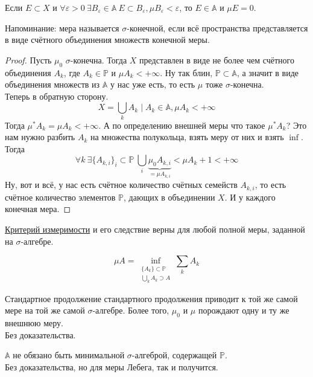 \documentclass{article}
\let\eps\varepsilon
\begin{document}
    \begin{corollary}
        Если $E\subset X$ и $\forall\eps>0~\exists B_\eps\in\mathbb A~E\subset B_\eps,\mu B_\eps<\eps$, то $E\in\mathbb A$ и $\mu E=0$.
    \end{corollary}
    \begin{property}
        Напоминание: мера называется $\sigma$-конечной, если всё пространства представляется в виде счётного объединения множеств конечной меры.
    \end{property}
    \begin{proof}
        Пусть $\mu_0$ $\sigma$-конечна. Тогда $X$ представлен в виде не более чем счётного объединения $A_k$, где $A_k\in\mathbb P$ и $\mu A_k<+\infty$. Ну так блин, $\mathbb P\subset\mathbb A$, а значит в виде объединения множеств из $\mathbb A$ у нас уже есть, то есть $\mu$ тоже $\sigma$-конечна.\\
        Теперь в обратную сторону. 
        $$
        X=\bigcup\limits_kA_k\mid A_k\in\mathbb A,\mu A_k<+\infty
        $$
        Тогда $\mu^*A_k=\mu A_k<+\infty$. А по определению внешней меры что такое $\mu^*A_k$? Это нам нужно разбить $A_k$ на множества полукольца, взять меру от них и взять $\inf$.  Тогда
        $$
        \forall k~\exists\{A_{k,i}\}_i\subset\mathbb P~\bigcup\limits_i\underbrace{\mu_0 A_{k,i}}_{=\mu A_{k,i}}<\mu A_k+1<+\infty
        $$
        Ну, вот и всё, у нас есть счётное количество счётных семейств $A_{k,i}$, то есть счётное количество элементов $\mathbb P$, дающих в объединении $X$. И у каждого конечная мера.
    \end{proof}
    \begin{remark}
        \hyperref[Критерий измеримости]{Критерий измеримости} и его следствие верны для любой полной меры, заданной на $\sigma$-алгебре.
    \end{remark}
    \begin{remark}
        $$\mu A=\inf\limits_{\substack{\{A_k\}\subset\mathbb P\\\bigcup_kA_k\supset A}}\sum\limits_{k}A_k$$
    \end{remark}
    \begin{claim}
        Стандартное продолжение стандартного продолжения приводит к той же самой мере на той же самой $\sigma$-алгебре. Более того, $\mu_0$ и $\mu$ порождают одну и ту же внешнюю меру.\\
        Без доказательства.
    \end{claim}
    \begin{claim}
        $\mathbb A$ не обязано быть минимальной $\sigma$-алгеброй, содержащей $\mathbb P$.\\
        Без доказательства, но для меры Лебега, так и получится.
    \end{claim}
\end{document}
